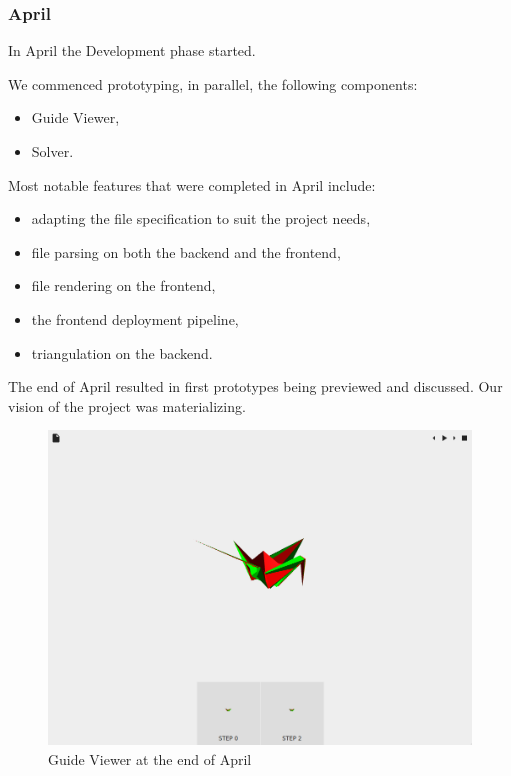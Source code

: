 \subsubsection{April}

In April the Development phase started.

We commenced prototyping, in parallel, the following components:
\begin{itemize}
	\item Guide Viewer,
	\item Solver.
\end{itemize}

Most notable features that were completed in April include:
\begin{itemize}
	\item adapting the  file specification to suit the project needs,
	\item {} file parsing on both the backend and the frontend,
	\item {} file rendering on the frontend,
	\item the frontend deployment pipeline,
	\item triangulation on the backend.
\end{itemize}
The end of April resulted in first prototypes being previewed and discussed. Our vision of the project was materializing.

\begin{figure}[H]
	\label{04-first-prototypes}
	\caption{Guide Viewer at the end of April}
  \centering
    \includegraphics[width=1.01\textwidth]{assets/prototype-front.png}
\end{figure}


